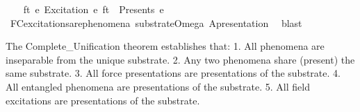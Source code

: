 \begin{isabellebody}
\isanewline
\ \ \isamarkupfalse%
\ {\isachardoublequoteopen}{\isasymforall}ft\ e{\isachardot}{\kern0pt}\ Excitation\ e\ ft\ {\isasymlongrightarrow}\ Presents\ e\ {\isasymOmega}{\isachardoublequoteclose}\isanewline
\ \ \ \ \isamarkupfalse%
\ FC{}{\isacharunderscore}{\kern0pt}excitations{\isacharunderscore}{\kern0pt}are{\isacharunderscore}{\kern0pt}phenomena\ substrate{\isacharunderscore}{\kern0pt}Omega\ A{}{\isacharunderscore}{\kern0pt}presentation\ \isamarkupfalse%
\ blast\isanewline
{}\isamarkupfalse%
%
\endisatagproof
{\isafoldproof}%
%
\isadelimproof
%
\endisadelimproof
%
\begin{isamarkuptext}%
The Complete_Unification theorem establishes that:
  1. All phenomena are inseparable from the unique substrate.
  2. Any two phenomena share (present) the same substrate.
  3. All force presentations are presentations of the substrate.
  4. All entangled phenomena are presentations of the substrate.
  5. All field excitations are presentations of the substrate.


\end{isamarkuptext}
\end{isabellebody}
